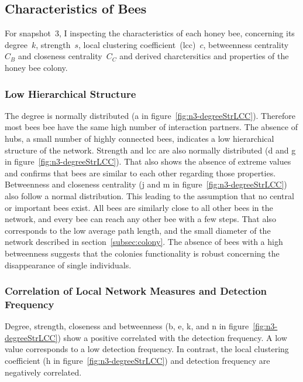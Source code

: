 \subsection{Characteristics of Bees}
For snapshot~3, I inspecting the characteristics of each honey bee, concerning its degree~$k$, strength~$s$, local clustering coefficient~(lcc)~$c$, betweenness centrality~$C_B$ and closeness centrality~$C_C$ and derived charctersitics and properties of the honey bee colony.

\subsubsection{Low Hierarchical Structure}
The degree is normally distributed (a in figure~\ref{fig:n3-degreeStrLCC}).
Therefore most bees bee have the same high number of interaction partners.
The absence of hubs, a small number of highly connected bees, indicates a low hierarchical structure of the network.
Strength and lcc are also normally distributed (d and g in figure~\ref{fig:n3-degreeStrLCC}).
That also shows the absence of extreme values and confirms that bees are similar to each other regarding those properties.
Betweenness and closeness centrality (j and m in figure~\ref{fig:n3-degreeStrLCC}) also follow a normal distribution.
This leading to the assumption that no central or important bees exist.
All bees are similarly close to all other bees in the network, and every bee can reach any other bee with a few steps.
That also corresponds to the low average path length, and the small diameter of the network described in section~\ref{subsec:colony}.
The absence of bees with a high betweenness suggests that the colonies functionality is robust concerning the disappearance of single individuals.

\subsubsection{Correlation of Local Network Measures and Detection Frequency}
Degree, strength, closeness and betweenness (b, e, k, and n in figure~\ref{fig:n3-degreeStrLCC}) show a positive correlated with the detection frequency. A low value corresponds to a low detection frequency. In contrast, the local clustering coefficient (h in figure~\ref{fig:n3-degreeStrLCC}) and detection frequency are negatively correlated.

